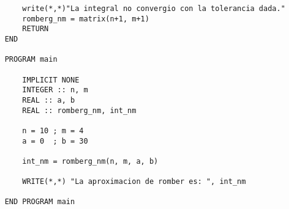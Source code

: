 \begin{lstlisting}
        write(*,*)"La integral no convergio con la tolerancia dada."
        romberg_nm = matrix(n+1, m+1)
        RETURN
    END

    PROGRAM main
 
        IMPLICIT NONE
        INTEGER :: n, m
        REAL :: a, b
        REAL :: romberg_nm, int_nm

        n = 10 ; m = 4
        a = 0  ; b = 30

        int_nm = romberg_nm(n, m, a, b)

        WRITE(*,*) "La aproximacion de romber es: ", int_nm

    END PROGRAM main
\end{lstlisting}